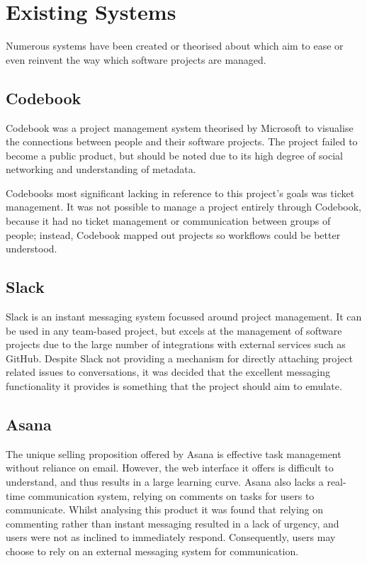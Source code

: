 \documentclass[a4paper]{l3proj}
\begin{document}
  \section{Existing Systems}
  \label{existingSystems}

  Numerous systems have been created or theorised about which aim to ease or even reinvent the way which software projects are managed.

  \subsection{Codebook}
  \label{codebook}
  Codebook was a project management system theorised by Microsoft to visualise the connections between people and their software projects. The project failed to become a public product, but should be noted due to its high degree of social networking and understanding of metadata.

  Codebooks most significant lacking in reference to this project’s goals was ticket management. It was not possible to manage a project entirely through Codebook, because it had no ticket management or communication between groups of people; instead, Codebook mapped out projects so workflows could be better understood.

  \subsection{Slack}
  \label{slack}
  Slack is an instant messaging system focussed around project management. It can be used in any team-based project, but excels at the management of software projects due to the large number of integrations with external services such as GitHub. Despite Slack not providing a mechanism for directly attaching project related issues to conversations, it was decided that the excellent messaging functionality it provides is something that the project should aim to emulate.

  \subsection{Asana}
  \label{asana}

  The unique selling proposition offered by Asana is effective task management without reliance on email. However, the web interface it offers is difficult to understand, and thus results in a large learning curve. Asana also lacks a real-time communication system, relying on comments on tasks for users to communicate. Whilst analysing this product it was found that relying on commenting rather than instant messaging resulted in a lack of urgency, and users were not as inclined to immediately respond. Consequently, users may choose to rely on an external messaging system for communication.
\end{document}
